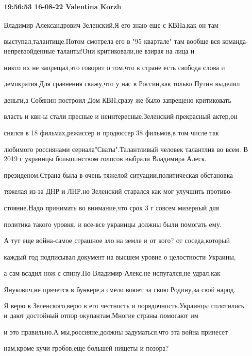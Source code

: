  
 
 
 
 


\paragraph{19:56:53 16-08-22 Valentina Korzh}

Владимир Александрович Зеленский.Я его знаю еще с КВНа,как он там 

выступал,талантище.Потом смотрела его в "95 квартале" там вообще вся команда-непревзойденные таланты!Они критиковали,не взирая на лица и

никто их не запрещал,это говорит о том,что в стране есть свобода слова и 

демократия.Для сравнения скажу,что у нас в России,как только Путин выделил

деньги,а Собянин построил Дом КВН,сразу же было запрещено критиковать

власть и квн-ы стали пресные и неинтересные.Зеленский-прекрасный актер,он 

снялся в 18 фильмах,режиссер и продюссер 38 фильмов,в том числе так 

любимого россиянами сериала"Сваты".Талантливый человек талантлив во всем. В 2019 г украинцы большинством голосов выбрали Владимира Алеск.

президеном.Страна была в очень тяжелой ситуации,политическая обстановка

тяжелая из-за ДНР и ЛНР,но Зеленский старался как мог улучшить противо-

стояние.Надо принимать во внимание,что срок 3 г совсем мизерный для 

политика такого уровня, и все-все украинцы должны были помогать ему.

А тут еще война-самое страшное зло на земле и от кого? от соседа,который 

каждый год подписывал документ на высшем уровне о целостности Украины,

а сам всадил нож с спину.Но Владимир Алекс.не испугался,не удрал,как 

Янукович,не прячется в бункере,а смело воюет за свою Родину,за свой народ.

Я верю в Зеленского,верю в его честность и порядочность.Украинцы сплотились и дают достойный отпор окупантам.Многие страны помогают им

и это правильно.А мы,россияне,должны задуматься,что эта война принесет 

нам,кроме кучи гробов,еще большей нищеты и позора? 
